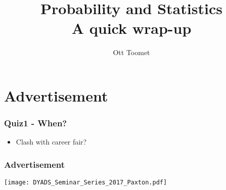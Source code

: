 \documentclass[mathserif, xcolor=table, svgnames]{beamer}
\title{Probability and Statistics\\
A quick wrap-up}
\author{Ott Toomet}
\begin{document}
\lstset{language=Python}

\begin{frame}
  \maketitle
\end{frame}

\begin{frame}
  \tableofcontents
\end{frame}

\section{Advertisement}

\begin{frame}
  \frametitle{Quiz1 - When?}
  \begin{itemize}
  \item Clash with career fair?
  \end{itemize}
\end{frame}

\begin{frame}
  \frametitle{Advertisement}
  \begin{center}
    \texttt{[image: DYADS\_Seminar\_Series\_2017\_Paxton.pdf]}
  \end{center}
\end{frame}
\end{document}
